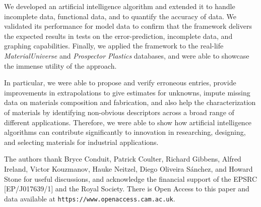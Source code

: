 \documentclass[review]{elsarticle}
\begin{document}
We developed an artificial intelligence algorithm and extended it to handle
incomplete data, functional data, and to quantify the accuracy of data. We
validated its performance for model data to confirm that the framework
delivers the expected results in tests on the error-prediction, incomplete
data, and graphing capabilities. Finally, we applied the framework to the
real-life \textit{MaterialUniverse} and \textit{Prospector Plastics}
databases, and were able to showcase the immense utility of the approach.

In particular, we were able to propose and verify erroneous entries, provide
improvements in extrapolations to give estimates for unknowns, impute
missing data on materials composition and fabrication, and also help the
characterization of materials by identifying non-obvious descriptors across
a broad range of different applications. Therefore, we were able to show how
artificial intelligence algorithms can contribute significantly to
innovation in researching, designing, and selecting materials for industrial
applications.

The authors thank Bryce Conduit, Patrick Coulter, Richard Gibbens, Alfred Ireland, Victor
Kouzmanov, Hauke Neitzel, Diego Oliveira S\'anchez, and Howard Stone for
useful discussions, and acknowledge the financial support of the EPSRC
[EP/J017639/1] and the Royal Society. There is Open Access to this paper
and data available at \texttt{https://www.openaccess.cam.ac.uk}.
\end{document}
